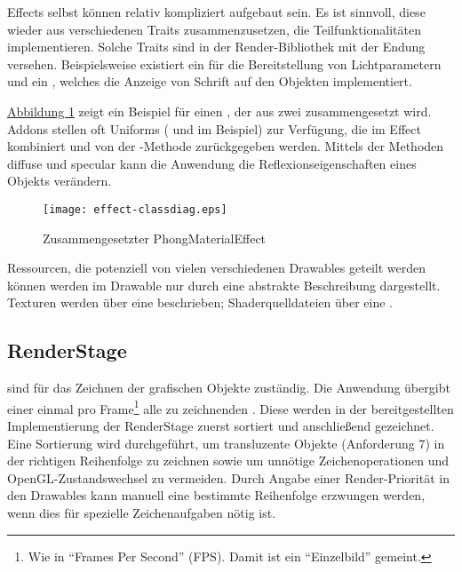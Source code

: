 \documentclass[a4paper,10pt]{sphinxmanual}
\begin{document}
Effects selbst können relativ kompliziert aufgebaut sein. Es ist sinnvoll, diese wieder aus verschiedenen Traits zusammenzusetzen, die Teilfunktionalitäten implementieren.
Solche Traits sind in der Render-Bibliothek mit der Endung  versehen.
Beispielsweise existiert ein  für die Bereitstellung von Lichtparametern und ein , welches die Anzeige von Schrift auf den Objekten implementiert.

\hyperref[renderbib:effect-classdiag]{Abbildung  \ref*{renderbib:effect-classdiag}} zeigt ein Beispiel für einen , der aus zwei  zusammengesetzt wird.
Addons stellen oft Uniforms ( und  im Beispiel) zur Verfügung, die im Effect kombiniert und von der -Methode zurückgegeben werden.
Mittels der Methoden diffuse und specular kann die Anwendung die Reflexionseigenschaften eines Objekts verändern.
\begin{figure}[htbp]
\centering
\capstart

\texttt{[image: effect-classdiag.eps]}
\caption{Zusammengesetzter PhongMaterialEffect}\label{renderbib:effect-classdiag}\end{figure}

Ressourcen, die potenziell von vielen verschiedenen Drawables geteilt werden können werden im Drawable nur durch eine abstrakte Beschreibung dargestellt.
Texturen werden über eine  beschrieben; Shaderquelldateien über eine .


\subsection{RenderStage}
\label{renderbib:renderstage}\label{renderbib:id5}
 sind für das Zeichnen der grafischen Objekte zuständig. Die Anwendung übergibt einer  einmal pro Frame\footnote{
Wie in "`Frames Per Second"' (FPS). Damit ist ein "`Einzelbild"' gemeint.
} alle zu zeichnenden .
Diese werden in der bereitgestellten Implementierung der RenderStage zuerst sortiert und anschließend gezeichnet.
Eine Sortierung wird durchgeführt, um transluzente Objekte (Anforderung 7) in der richtigen Reihenfolge zu zeichnen sowie um unnötige Zeichenoperationen und OpenGL-Zustandswechsel zu vermeiden.
Durch Angabe einer Render-Priorität in den Drawables kann manuell eine bestimmte Reihenfolge erzwungen werden, wenn dies für spezielle Zeichenaufgaben nötig ist.
\end{document}

